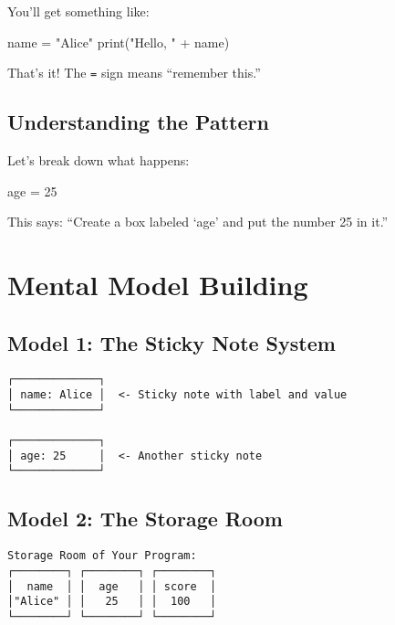 \documentclass[
  letterpaper,
  DIV=11,
  numbers=noendperiod,
  oneside]{scrreprt}
\newenvironment{Shaded}{}{}
\newcommand{\BuiltInTok}[1]{\textcolor[rgb]{0.84,0.23,0.29}{#1}}
\newcommand{\DecValTok}[1]{\textcolor[rgb]{0.00,0.36,0.77}{#1}}
\newcommand{\NormalTok}[1]{\textcolor[rgb]{0.14,0.16,0.18}{#1}}
\newcommand{\OperatorTok}[1]{\textcolor[rgb]{0.14,0.16,0.18}{#1}}
\newcommand{\StringTok}[1]{\textcolor[rgb]{0.01,0.18,0.38}{#1}}
\begin{document}
You'll get something like:

\begin{Shaded}
\begin{Highlighting}[]
\NormalTok{name }\OperatorTok{=} \StringTok{"Alice"}
\BuiltInTok{print}\NormalTok{(}\StringTok{"Hello, "} \OperatorTok{+}\NormalTok{ name)}
\end{Highlighting}
\end{Shaded}

That's it! The \texttt{=} sign means ``remember this.''

\subsection{Understanding the Pattern}\label{understanding-the-pattern}

Let's break down what happens:

\begin{Shaded}
\begin{Highlighting}[]
\NormalTok{age }\OperatorTok{=} \DecValTok{25}
\end{Highlighting}
\end{Shaded}

This says: ``Create a box labeled `age' and put the number 25 in it.''

\section{Mental Model Building}\label{mental-model-building-1}

\subsection{Model 1: The Sticky Note
System}\label{model-1-the-sticky-note-system}

\begin{verbatim}
┌─────────────┐
│ name: Alice │  <- Sticky note with label and value
└─────────────┘

┌─────────────┐
│ age: 25     │  <- Another sticky note
└─────────────┘
\end{verbatim}

\subsection{Model 2: The Storage Room}\label{model-2-the-storage-room}

\begin{verbatim}
Storage Room of Your Program:
┌────────┐ ┌────────┐ ┌────────┐
│  name  │ │  age   │ │ score  │
│"Alice" │ │   25   │ │  100   │
└────────┘ └────────┘ └────────┘
\end{verbatim}
\end{document}
